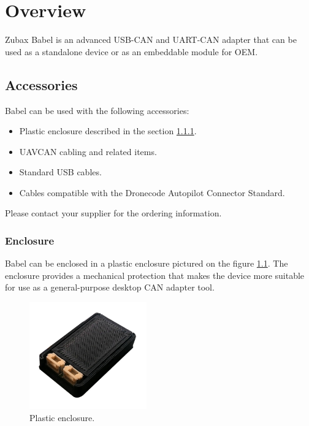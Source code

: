 \documentclass{zubaxdoc}
\begin{document}
\chapter{Overview}

Zubax Babel is an advanced USB-CAN and UART-CAN adapter
that can be used as a standalone device or as an embeddable module for
OEM.

\section{Accessories}

Babel can be used with the following accessories:
\begin{itemize}
    \item Plastic enclosure described in the section \ref{sec:enclosure}.
    \item UAVCAN cabling and related items.
    \item Standard USB cables.
    \item Cables compatible with the Dronecode Autopilot Connector Standard.
\end{itemize}

Please contact your supplier for the ordering information.

\subsection{Enclosure}\label{sec:enclosure}

Babel can be enclosed in a plastic enclosure pictured on the figure \ref{fig:enclosure}.
The enclosure provides a mechanical protection that makes the device more suitable for use as a
general-purpose desktop CAN adapter tool.

\begin{figure}[hb]
    \centering
    \includegraphics[width=0.45\textwidth]{housing}
    \caption{Plastic enclosure.\label{fig:enclosure}}
\end{figure}
\end{document}

